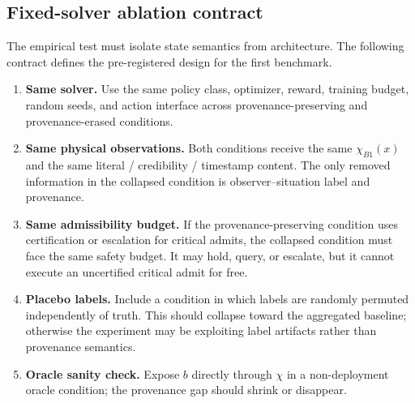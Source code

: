 \documentclass[11pt]{article}
\newcommand{\1}{\mathbf{1}}
\theoremstyle{definition}
\theoremstyle{plain}
\theoremstyle{remark}
\begin{document}
\subsection{Fixed-solver ablation contract}
\label{supp:subsec:fixed-solver-contract}

The empirical test must isolate state semantics from architecture. The following contract defines the pre-registered design for the first benchmark.

\begin{enumerate}[leftmargin=1.7em,label=\textbf{A\arabic*:}]
\item \textbf{Same solver.} Use the same policy class, optimizer, reward, training budget, random seeds, and action interface across provenance-preserving and provenance-erased conditions.
\item \textbf{Same physical observations.} Both conditions receive the same $\chi_{B1}(x)$ and the same literal / credibility / timestamp content. The only removed information in the collapsed condition is observer--situation label and provenance.
\item \textbf{Same admissibility budget.} If the provenance-preserving condition uses certification or escalation for critical admits, the collapsed condition must face the same safety budget. It may hold, query, or escalate, but it cannot execute an uncertified critical admit for free.
\item \textbf{Placebo labels.} Include a condition in which labels are randomly permuted independently of truth. This should collapse toward the aggregated baseline; otherwise the experiment may be exploiting label artifacts rather than provenance semantics.
\item \textbf{Oracle sanity check.} Expose $b$ directly through $\chi$ in a non-deployment oracle condition; the provenance gap should shrink or disappear.
\end{enumerate}
\end{document}
